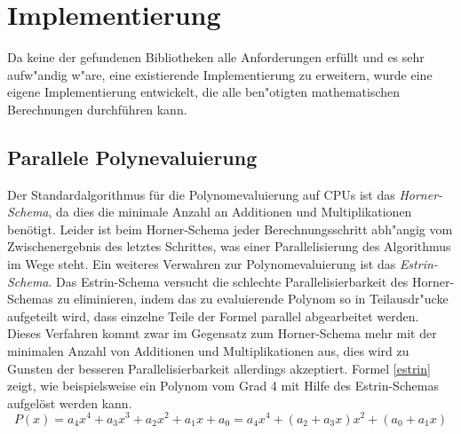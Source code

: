 \section{Implementierung}

Da keine der gefundenen Bibliotheken alle Anforderungen erfüllt und es sehr aufw"andig w"are, eine existierende Implementierung zu erweitern, wurde eine eigene Implementierung entwickelt, die alle ben"otigten mathematischen Berechnungen durchführen kann.

\subsection{Parallele Polynevaluierung}
Der Standardalgorithmus für die Polynomevaluierung auf CPUs ist das \textit{Horner-Schema}, da dies die minimale Anzahl an Additionen und Multiplikationen benötigt\cite{Ostrowski:1954}\cite{Pan:1966}. Leider ist beim Horner-Schema jeder Berechnungsschritt abh"angig vom Zwischenergebnis des letztes Schrittes, was einer Parallelisierung des Algorithmus im Wege steht.\newline
Ein weiteres Verwahren zur Polynomevaluierung ist das \textit{Estrin-Schema}\cite{EstrinsScheme}. Das Estrin-Schema versucht die schlechte Parallelisierbarkeit des Horner-Schemas zu eliminieren, indem das zu evaluierende Polynom so in Teilausdr"ucke aufgeteilt wird, dass einzelne Teile der Formel parallel abgearbeitet werden. Dieses Verfahren kommt zwar im Gegensatz zum Horner-Schema mehr mit der minimalen Anzahl von Additionen und Multiplikationen aus, dies wird zu Gunsten der besseren Parallelisierbarkeit allerdings akzeptiert.\newline
Formel \eqref{estrin} zeigt, wie beispielsweise ein Polynom vom Grad 4 mit Hilfe des Estrin-Schemas aufgelöst werden kann.
\begin{equation}\label{estrin}
P(x) = a_4x^4 + a_3x^3 + a_2x^2 + a_1x + a_0 = a_4x^4 + (a_2+a_3x)x^2 + (a_0+a_1x)
\end{equation}

